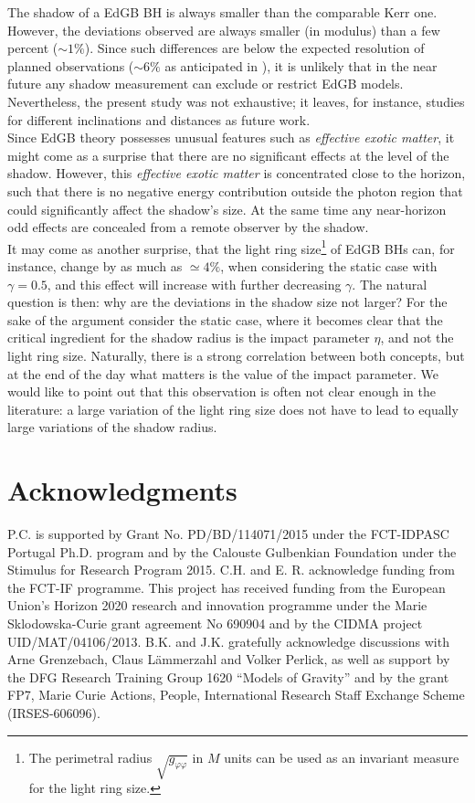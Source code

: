 \documentclass[12pt]{article}
\begin{document}
The shadow of a EdGB BH is always smaller than the comparable Kerr one. However, the deviations observed are always smaller (in modulus) than a few percent ($\sim 1\%$). Since such differences are below the expected resolution of planned observations {($\sim 6\%$ as anticipated in }\cite{Johannsen:2016vqy}), it is unlikely that in the near future any shadow measurement can exclude or restrict EdGB models. {Nevertheless, the present study was not exhaustive; it leaves, for instance, studies for different inclinations and distances as future work.}\\
Since EdGB theory possesses unusual features such as \textit{effective exotic matter}, it might come as a surprise that there are no significant effects at the level of the shadow. 
However, this \textit{effective exotic matter} is concentrated 
close to the horizon, such that there is no negative energy contribution
outside the photon region that could significantly affect the shadow's size.
At the same time any near-horizon odd effects are concealed from a remote observer by the shadow.\\
It may come as another surprise, that
the light ring size\footnote{The perimetral radius $\sqrt{g_{\varphi\varphi}}$ in $M$ units can be used as an invariant measure for the light ring size.} 
of EdGB BHs can, for instance, change by as much as $\simeq 4\%$, when considering the static case with $\gamma=0.5$,
and this effect will increase with further decreasing $\gamma$.
The natural question is then: why are the deviations in the shadow size not larger? For the sake of the argument consider the static case, where it becomes clear that the critical ingredient for the shadow radius is the impact parameter $\eta$, and not the light ring size. Naturally, there is a strong correlation between both concepts, but at the end of the day what matters is the value of the impact parameter. We would like to point out that this observation is often not clear enough in the literature: a large variation of the light ring size does not have to lead to equally large variations of the shadow radius.

 
\section*{Acknowledgments}

P.C. is supported by Grant No.  PD/BD/114071/2015 under the FCT-IDPASC Portugal Ph.D. program and by the Calouste Gulbenkian Foundation under the Stimulus for Research Program 2015.
C.H. and E. R. acknowledge funding from the FCT-IF programme.  This project has received funding
from  the  European  Union's  Horizon  2020  research  and  innovation  programme  under  the  Marie
Sklodowska-Curie grant agreement No 690904 and by the CIDMA project UID/MAT/04106/2013.
B.K. and J.K. gratefully acknowledge discussions with
Arne Grenzebach, Claus L\"ammerzahl and Volker Perlick,
as well as support by the DFG
Research Training Group 1620 ``Models of Gravity''
and by the grant FP7, Marie Curie Actions, People,
International Research Staff Exchange Scheme (IRSES-606096).
\end{document}
